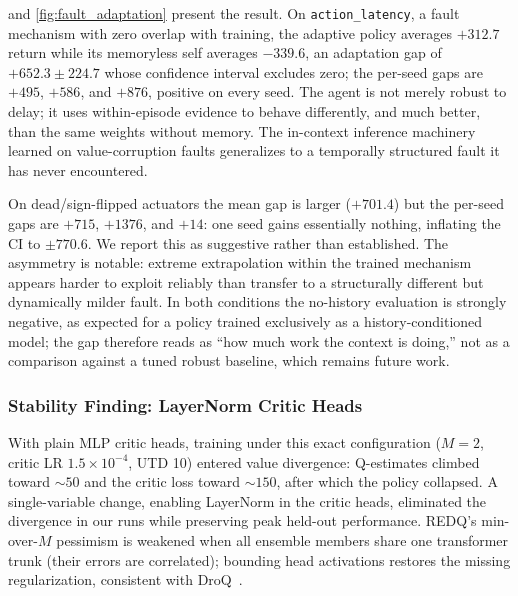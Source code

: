 \documentclass[conference]{IEEEtran}
\begin{document}
 and \cref{fig:fault_adaptation} present the result. On \texttt{action\_latency}, a fault mechanism with zero overlap with training, the adaptive policy averages $+312.7$ return while its memoryless self averages $-339.6$, an adaptation gap of $+652.3 \pm 224.7$ whose confidence interval excludes zero; the per-seed gaps are $+495$, $+586$, and $+876$, positive on every seed. The agent is not merely robust to delay; it uses within-episode evidence to behave differently, and much better, than the same weights without memory. The in-context inference machinery learned on value-corruption faults generalizes to a temporally structured fault it has never encountered.



On dead/sign-flipped actuators the mean gap is larger ($+701.4$) but the per-seed gaps are $+715$, $+1376$, and $+14$: one seed gains essentially nothing, inflating the CI to $\pm 770.6$. We report this as suggestive rather than established. The asymmetry is notable: extreme extrapolation within the trained mechanism appears harder to exploit reliably than transfer to a structurally different but dynamically milder fault. In both conditions the no-history evaluation is strongly negative, as expected for a policy trained exclusively as a history-conditioned model; the gap therefore reads as ``how much work the context is doing,'' not as a comparison against a tuned robust baseline, which remains future work.



\subsubsection{Stability Finding: LayerNorm Critic Heads}

\label{sec:stability}

With plain MLP critic heads, training under this exact configuration ($M{=}2$, critic LR $1.5{\times}10^{-4}$, UTD 10) entered value divergence: Q-estimates climbed toward ${\sim}50$ and the critic loss toward ${\sim}150$, after which the policy collapsed. A single-variable change, enabling LayerNorm in the critic heads, eliminated the divergence in our runs while preserving peak held-out performance. REDQ's min-over-$M$ pessimism is weakened when all ensemble members share one transformer trunk (their errors are correlated); bounding head activations restores the missing regularization, consistent with DroQ~\cite{droq}.
\end{document}
